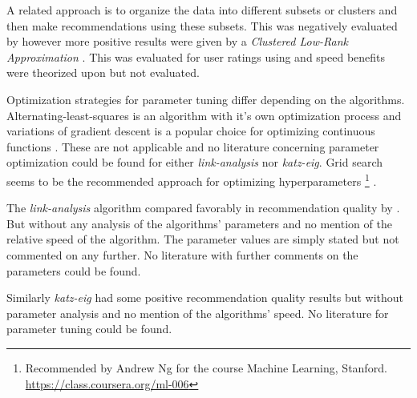 A related approach is to organize the data into different subsets or clusters and then make recommendations using these subsets. This was negatively evaluated by \citep{cacheda2011comparison} however more positive results were given by a \textit{Clustered Low-Rank Approximation} \citep{niklas, savas2011clustered}.  This was evaluated for user ratings using \rmse and speed benefits were theorized upon but not evaluated.

Optimization strategies for parameter tuning differ depending on the algorithms. Alternating-least-squares is an algorithm with it's own optimization process and variations of gradient descent is a popular choice for optimizing continuous functions \citep{hu2008collaborative}. These are not applicable and no literature concerning parameter optimization could be found for either \textit{link-analysis} nor \textit{katz-eig}.  Grid search seems to be the recommended approach for optimizing hyperparameters
\footnote{Recommended by Andrew Ng for the course Machine Learning, Stanford. \url{https://class.coursera.org/ml-006}}
.

The \textit{link-analysis} algorithm compared favorably in recommendation quality by \citep{huang2007comparison}. But without any analysis of the algorithms' parameters and no mention of the relative speed of the algorithm. The parameter values are simply stated but not commented on any further. No literature with further comments on the parameters could be found.

Similarly \textit{katz-eig} had some positive recommendation quality results \citep{shin2012multi} but without parameter analysis and no mention of the algorithms' speed. No literature for parameter tuning could be found.

